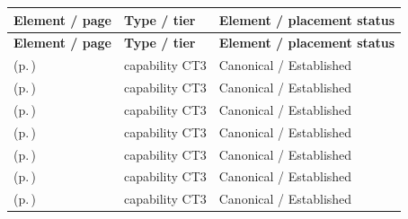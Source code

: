 \begingroup\small\setlength{\TableWidth}{\dimexpr\linewidth-6\tabcolsep-4\arrayrulewidth\relax}
\begin{longtable}{|>{\raggedright\arraybackslash}p{0.52\TableWidth}|>{\raggedright\arraybackslash}p{0.2\TableWidth}|>{\raggedright\arraybackslash}p{0.28\TableWidth}|}
\hline\rowcolor{TableHead}\textbf{Element / page} & \textbf{Type / tier} & \textbf{Element / placement status}\\\hline\endfirsthead
\hline\rowcolor{TableHead}\textbf{Element / page} & \textbf{Type / tier} & \textbf{Element / placement status}\\\hline\endhead
\hline\endfoot
\nameref{cap:bc-diagnostic-service-appointment-management} (p.\,\pageref{cap:bc-diagnostic-service-appointment-management}) & capability CT3 & Canonical / Established\\\hline
\nameref{cap:bc-diagnostic-service-delivery} (p.\,\pageref{cap:bc-diagnostic-service-delivery}) & capability CT3 & Canonical / Established\\\hline
\nameref{cap:bc-diagnostic-specimen-management} (p.\,\pageref{cap:bc-diagnostic-specimen-management}) & capability CT3 & Canonical / Established\\\hline
\nameref{cap:bc-diagnostic-data-management} (p.\,\pageref{cap:bc-diagnostic-data-management}) & capability CT3 & Canonical / Established\\\hline
\nameref{cap:bc-diagnostic-interpretation} (p.\,\pageref{cap:bc-diagnostic-interpretation}) & capability CT3 & Canonical / Established\\\hline
\nameref{cap:bc-diagnostic-report-management} (p.\,\pageref{cap:bc-diagnostic-report-management}) & capability CT3 & Canonical / Established\\\hline
\nameref{cap:bc-diagnostic-report-distribution} (p.\,\pageref{cap:bc-diagnostic-report-distribution}) & capability CT3 & Canonical / Established\\\hline
\end{longtable}\endgroup

